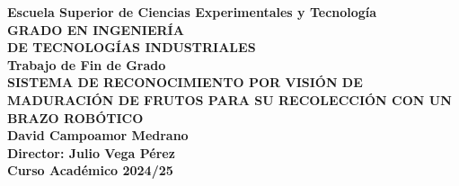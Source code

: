 \newpage
{
\color{white}
\pagecolor[rgb]{0,0.125,0.357} %

\thispagestyle{empty}

\begin{figure}[H]
  \centerline{}
\end{figure}

\begin{center}
  {\large {\bf Escuela Superior de Ciencias Experimentales y Tecnología}}\\[1.2cm]
  {\large {\bf GRADO EN INGENIERÍA\\ 
  DE TECNOLOGÍAS INDUSTRIALES}}\\[1.2cm]
  {\large {\bf Trabajo de Fin de Grado}}\\[1.2cm]
  {\Large{\bf SISTEMA DE RECONOCIMIENTO POR VISIÓN DE MADURACIÓN DE FRUTOS PARA SU RECOLECCIÓN CON UN BRAZO ROBÓTICO}}\\[2cm]
  {\large {\bf David Campoamor Medrano}}\\[2cm]
  {\large {\bf Director: Julio Vega Pérez}}\\[0.35cm]
  {\large {\bf Curso Académico 2024/25}}\\[1cm]
  
\end{center}

\clearpage
\nopagecolor
}


